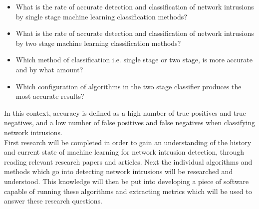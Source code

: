 		\begin{itemize}
			\item What is the rate of accurate detection and classification of network intrusions by single stage machine learning classification methods?
			\item What is the rate of accurate detection and classification of network intrusions by two stage machine learning classification methods?
			\item Which method of classification i.e. single stage or two stage, is more accurate and by what amount?
			\item Which configuration of algorithms in the two stage classifier produces the most accurate results?
		\end{itemize}
		
In this context, accuracy is defined as a high number of true positives and true negatives, and a low number of false positives and false negatives when classifying network intrusions. \\

		First research will be completed in order to gain an understanding of the history and current state of machine learning for network intrusion detection, through reading relevant research papers and articles. Next the individual algorithms and methods which go into detecting network intrusions will be researched and understood. This knowledge will then be put into developing a piece of software capable of running these algorithms and extracting metrics which will be used to answer these research questions.
